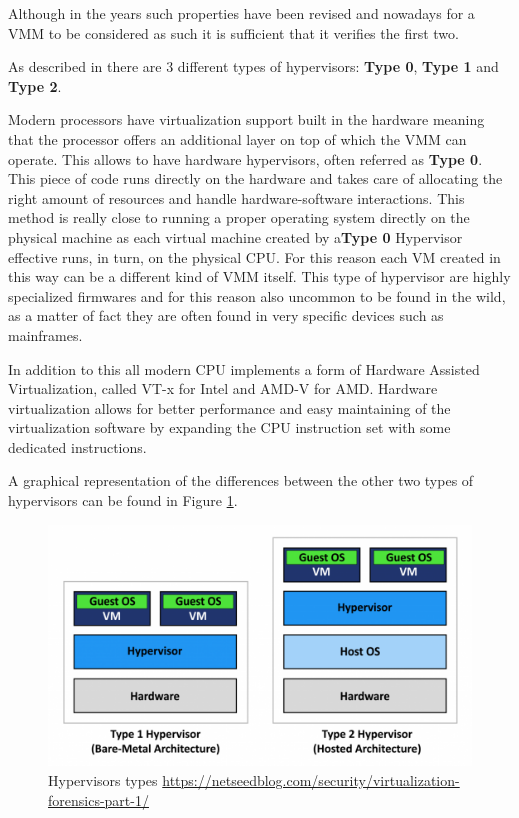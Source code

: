 Although in the years such properties have been revised and nowadays for a VMM to be considered as such it is sufficient that it verifies the first two. 

As described in\cite{os} there are 3 different types of hypervisors: \textbf{Type 0}, \textbf{Type 1} and \textbf{Type 2}. 

Modern processors have virtualization support built in the hardware meaning that the processor offers an additional layer on top of which the VMM can operate. This allows to have hardware hypervisors, often referred as \textbf{Type 0}. This piece of code runs directly on the hardware and takes care of allocating the right amount of resources and handle hardware-software interactions. This method is really close to running a proper operating system directly on the physical machine as each virtual machine created by a\textbf{Type 0} Hypervisor effective runs, in turn, on the physical CPU. For this reason each VM created in this way can be a different kind of VMM itself. This type of hypervisor are highly specialized firmwares and for this reason also uncommon to be found in the wild, as a matter of fact they are often found in very specific devices such as mainframes. 

In addition to this all modern CPU implements a form of Hardware Assisted Virtualization, called VT-x for Intel and AMD-V for AMD. Hardware virtualization allows for better performance and easy maintaining of the virtualization software by expanding the CPU instruction set with some dedicated instructions. 

A graphical representation of the differences between the other two types of hypervisors can be found in Figure \ref{fig:hip}.

\begin{figure}[htp]
\centering
\includegraphics[width=\linewidth]{images/hip.png}
\caption{Hypervisors types \newline \url{https://netseedblog.com/security/virtualization-forensics-part-1/}}
\label{fig:hip}
\end{figure}



